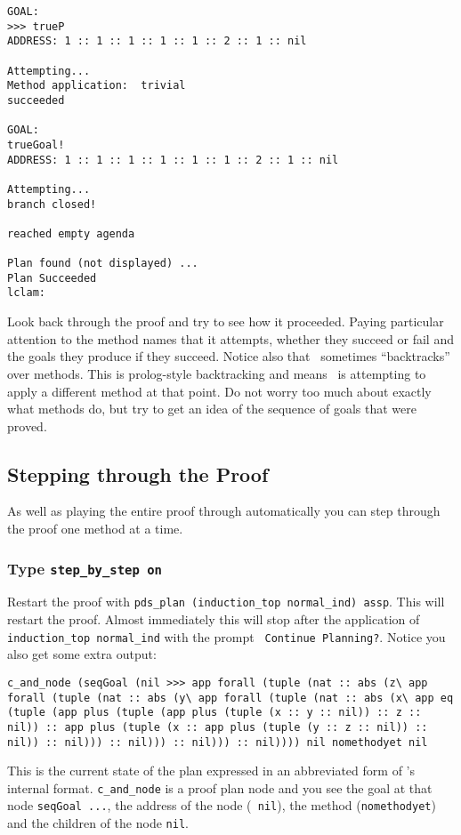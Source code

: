 \begin{verbatim}
GOAL:
>>> trueP
ADDRESS: 1 :: 1 :: 1 :: 1 :: 1 :: 2 :: 1 :: nil

Attempting... 
Method application:  trivial
succeeded

GOAL:
trueGoal!
ADDRESS: 1 :: 1 :: 1 :: 1 :: 1 :: 1 :: 2 :: 1 :: nil

Attempting... 
branch closed!

reached empty agenda

Plan found (not displayed) ...
Plan Succeeded
lclam:
\end{verbatim}
Look back through the proof and try to see how it proceeded.  Paying
particular attention to the method names that it attempts, whether
they succeed or fail and the goals they produce if they succeed.
Notice also that \lclam\ sometimes ``backtracks''
over methods.  This is prolog-style backtracking and means \lclam\ is
attempting to apply a different method at that point.  Do not worry
too much about exactly what methods do, but try to get an idea of the
sequence of goals that were proved.


\subsection{Stepping through the Proof}
As well as playing the entire proof through automatically you can step 
through the proof one method at a time.  

\subsubsection*{Type {\tt step\_by\_step on}}
Restart the proof with {\tt pds\_plan (induction\_top normal\_ind)
assp}.  This
will restart the proof.  Almost immediately this will stop after the
application of {\tt induction\_top normal\_ind} with the prompt {\tt
Continue Planning?}.  Notice you also get
some extra output:
\begin{verbatim}
c_and_node (seqGoal (nil >>> app forall (tuple (nat :: abs (z\ app
forall (tuple (nat :: abs (y\ app forall (tuple (nat :: abs (x\ app eq
(tuple (app plus (tuple (app plus (tuple (x :: y :: nil)) :: z ::
nil)) :: app plus (tuple (x :: app plus (tuple (y :: z :: nil)) ::
nil)) :: nil))) :: nil))) :: nil))) :: nil)))) nil nomethodyet nil 
\end{verbatim}
This is the current state of the plan expressed in an abbreviated form 
of \lclam's internal format.  {\tt c\_and\_node}
is a proof plan node and you see the goal at that node {\tt seqGoal
...}, the address of the node ({\tt 
nil}), the method ({\tt nomethodyet}) 
and the children of the node {\tt nil}. 

